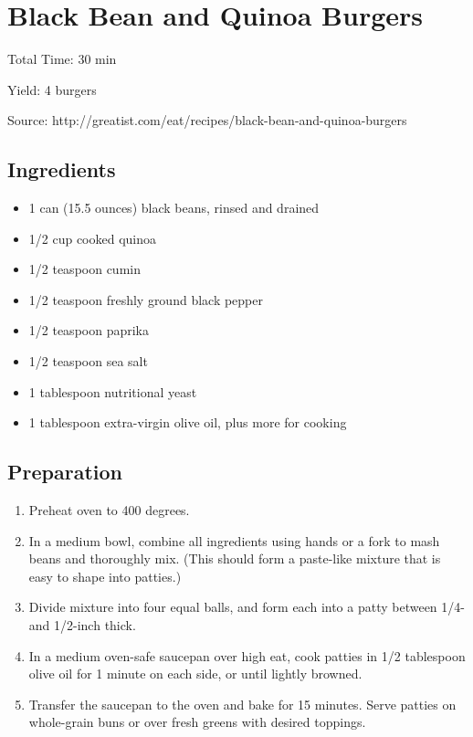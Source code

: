 \section{Black Bean and Quinoa Burgers}

\begin{center}
Total Time: 30 min

\noindent Yield: 4 burgers

\vspace{1em}

Source: http://greatist.com/eat/recipes/black-bean-and-quinoa-burgers
\end{center}

\subsection{Ingredients}
\begin{multicols}{2}
\begin{itemize}
    \item 1 can (15.5 ounces) black beans, rinsed and drained
    \item 1/2 cup cooked quinoa
    \item 1/2 teaspoon cumin
    \item 1/2 teaspoon freshly ground black pepper
    \item 1/2 teaspoon paprika
    \item 1/2 teaspoon sea salt
    \item 1 tablespoon nutritional yeast
    \item 1 tablespoon extra-virgin olive oil, plus more for cooking
\end{itemize}
\end{multicols}

\subsection{Preparation}
\begin{enumerate}
    \item Preheat oven to 400 degrees.
    \item In a medium bowl, combine all ingredients using hands or a fork to mash beans and thoroughly mix. (This should form a paste-like mixture that is easy to shape into patties.)
    \item Divide mixture into four equal balls, and form each into a patty between 1/4- and 1/2-inch thick.
    \item In a medium oven-safe saucepan over high eat, cook patties in 1/2 tablespoon olive oil for 1 minute on each side, or until lightly browned.
    \item Transfer the saucepan to the oven and bake for 15 minutes. Serve patties on whole-grain buns or over fresh greens with desired toppings.
\end{enumerate}

